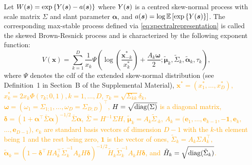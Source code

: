 \documentclass[12pt]{article}
\newcommand{\PZ}{\textcolor{orange}}
\begin{document}
\begin{theorem}
\label{thm:skewBR}
Let $W({\boldsymbol{s}}) = \exp \left\{ Y({\boldsymbol{s}}) - a({\boldsymbol{s}})\right\}$ where $Y({\boldsymbol{s}})$ is a centred skew-normal process with scale matrix $\Sigma$ and slant parameter $\bm \alpha$, and $a({\boldsymbol{s}}) = \log \mathbb{E} \left[ \exp\left\{ Y({\boldsymbol{s}}) \right\}\right]$.
The corresponding max-stable process defined via \eqref{eq:spectralrepresentation} is called the skewed Brown-Resnick process and is characterized by the following exponent function:
%
\begin{equation}
\label{eq:V_skBR}
V(\bm x) =\sum_{k=1}^D \frac{1}{x_k} 
\Psi \left(\log \left( \frac{\bm x^*_{-k}}{x^*_k} \right) + \frac{A_k\bm\omega}{2} ; \tilde{\bm\mu}_k, \tilde\Sigma_k, \tilde{\bm \alpha}_k, \tau_k \right),
\end{equation}
%
where $\Psi$ denotes the cdf of the extended skew-normal distribution (see Definition~1 in Section~B of the Supplemental Material),
\PZ{$\bm x^* = \left( x^*_1, \ldots, x^*_D\right)$, 
$x^*_k = 2x_k \Phi\left( \tau_k; 0, 1 \right), k=1, \ldots, D$,
$\tau_k = \sqrt{\Sigma_{kk}}\delta_k$, $\bm\omega = \left( \omega_1=\Sigma_{1;1}, \ldots,  \omega_D=\Sigma_{D;D}\right)^\top$, $H = \sqrt{{\rm diag}(\Sigma)}$ is a diagonal matrix, 
$\bm \delta = \left( 1 + \bm \alpha^\top \bar{\Sigma} \bm \alpha\right)^{-1/2}\bar{\Sigma} \bm \alpha$, 
$\bar{\Sigma} = H^{-1} \Sigma H$,
$\tilde{\bm\mu}_k = A_k \tilde\Sigma_{\cdot k}$, 
$A_k = (\bm e_1, \ldots,\bm e_{k-1}, -\bm 1,\bm e_{k},$ $\ldots,\bm e_{D-1})$, }
\PZ{$e_k$ are standard basis vectors of dimension $D-1$ with the $k$-th element being 1 and the rest being zero, $\bm 1$ is the vector of ones, 
$\tilde\Sigma_k = A_k \Sigma A_k^\top$, 
$\tilde{\bm\alpha}_k = \left(1-\bm\delta^\top H A_k^\top\tilde\Sigma_k^{-1} A_k H\bm\delta \right)^{-1/2} \tilde{H}_k\tilde\Sigma_k^{-1}A_k H\bm\delta$, 
and $\tilde{H}_k = \sqrt{{\rm diag}(\tilde\Sigma_k)}$.}
\end{theorem}
\end{document}
